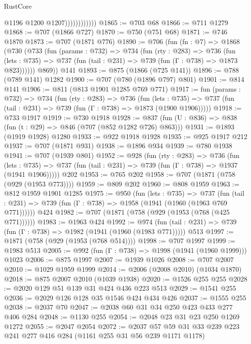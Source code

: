 \begin{lexlean}{RustCore}
\begin{coremodule}
                            @1196
                            @1200
                            @1207))))))))))))
@1865 := @703 @68
@1866 := @711 @1279
@1868 := @707 (@1866 @727)
@1870 := @750 (@751 @68)
@1871 := @746 @1870
@1873 := @707 (@1871 @776)
@1890 := @706
    (fun (fn : @7) =>
    @1868
      (@730
        (@733
          (fun (params : @732) =>
          @734
            (fun (rty : @283) =>
            @736
              (fun (lets : @735) =>
              @737 (fun (tail : @231) => @739 (fun (Γ : @738) => @1873 @823))))))
        @869))
    @141
@1893 := @875 (@1866 (@725 @141))
@1896 := @788 (@789 @141) @1282
@1900 := @707 (@780 (@1896 @797) @801)
@1901 := @814 @141
@1906 := @811 (@813 @1901 @1285 @769 @771)
@1917 := fun (params : @732) =>
  @734
    (fun (rty : @283) =>
    @736
      (fun (lets : @735) =>
      @737 (fun (tail : @231) => @739 (fun (Γ : @738) => @1873 (@1900 @1906)))))
@1918 := @733 @1917
@1919 := @730 @1918
@1928 := @837 (fun (U : @836) => @838 (fun (t : @29) => @846 (@707 (@852 @1282 @726) @863)))
@1931 := @1893 (@1919 @1928) @1280
@1933 := @922 @1918 @1928
@1935 := @925 @1917 @212
@1937 := @707 (@1871 @931)
@1938 := @1896 @934
@1939 := @780 @1938
@1941 := @707 (@1939 @801)
@1952 := @928
    (fun (rty : @283) =>
    @736
      (fun (lets : @735) =>
      @737 (fun (tail : @231) => @739 (fun (Γ : @738) => @1937 (@1941 @1906)))))
    @202
@1953 := @765 @202
@1958 := @707 (@1871 (@758 (@929 (@1953 @773))))
@1959 := @809 @202
@1960 := @808 @1959
@1963 := @812 @1959 @1901 @1285
@1975 := @950
    (fun (lets : @735) =>
    @737 (fun (tail : @231) => @739 (fun (Γ : @738) => @1958 (@1941 (@1960 (@1963 @769 @771))))))
    @424
@1982 := @707 (@1871 (@758 (@929 (@1953 (@768 (@425 @771))))))
@1983 := @1963 @424
@1992 := @974
    (fun (tail : @231) => @739 (fun (Γ : @738) => @1982 (@1941 (@1960 (@1983 @771)))))
    @513
@1997 := @1871 (@758 (@929 (@1953 (@768 @514))))
@1998 := @707 @1997
@1999 := @1983 @513
@2005 := @992 (fun (Γ : @738) => @1998 (@1941 (@1960 @1999))) @1023
@2006 := @875 @1997
@2007 := @1939 @1026
@2008 := @707 @2007
@2010 := @1029 @1959 @1999
@2014 := @2006 (@2008 @2010) (@1034 @1870)
@2018 := @875 @2007 @2010 (@1039 @1938)
@2020 := @1526 @255 @255
@2028 := @2020 @129 @51 @139 @31 @424 @436 @223 @513
@2029 := @1541 @255
@2036 := @2029 @126 @128 @35 @1546 @424 @434 @426
@2037 := @1555 @255
@2038 := @2037 @70
@2047 := @2038 @60 @31 @34 @250 @423 @433 @277 @406 @284
@2048 := @1130 @255
@2054 := @2048 @23 @31 @23 @250 @1269 @1272
@2055 := @2047 @2054
@2072 := @2037 @57 @59 @31 @33 @239 @223 @241 @277 @416 @284 (@1161 @255 @31 @56 @239 @1171 @1178)

\end{coremodule}
\end{lexlean}
